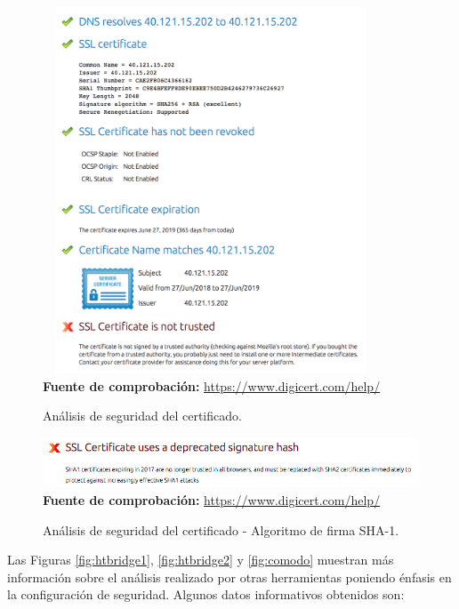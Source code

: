 \documentclass[12pt,a4paper, twoside]{report}
\begin{document}
		\newpage
		
		\begin{figure}[!ht]   
			\caption{Análisis de seguridad del certificado.} 
			\begin{center} 
	 			\includegraphics[width=10cm,height=10.9cm]{Images/implement/digicert} \\
				\label{fig:digicert} 
				\textbf{Fuente de comprobación:} \url{https://www.digicert.com/help/}
			\end{center}  
		\end{figure}	
			
		\begin{figure}[!ht]   
			\caption{Análisis de seguridad del certificado - Algoritmo de firma SHA-1.} 
			\begin{center} 
	 			\includegraphics[width=14cm,height=1.5cm]{Images/implement/digicert_sha1} \\
				\label{fig:digicert_sha1} 
				\textbf{Fuente de comprobación:} \url{https://www.digicert.com/help/}
			\end{center}  
		\end{figure}	

	Las Figuras \ref{fig:htbridge1}, \ref{fig:htbridge2} y \ref{fig:comodo} muestran más información sobre el análisis realizado por otras herramientas poniendo énfasis en la configuración de seguridad. Algunos datos informativos obtenidos son: 
	
\end{document}
